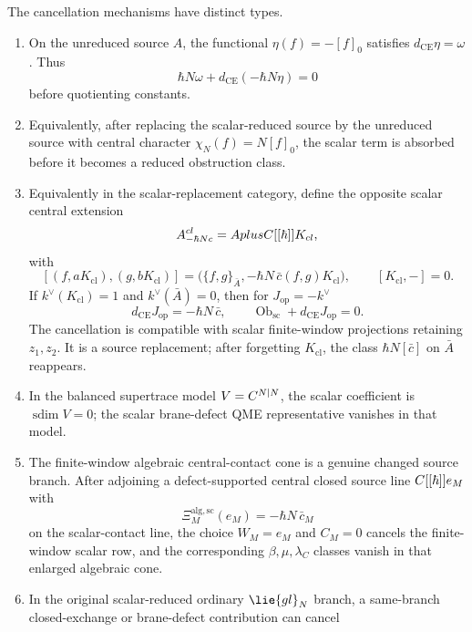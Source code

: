 \documentclass[11pt]{memoir}
\begin{document}
\begin{thm}
  The cancellation mechanisms have distinct types.
  \begin{enumerate}
    \item On the unreduced source \(A\), the functional
      \(\eta(f)=-[f]_0\) satisfies \(d_{\mathrm{CE}}\eta=\omega\).  Thus
      \[
        \hbar N\omega+d_{\mathrm{CE}}(-\hbar N\eta)=0
      \]
      before quotienting constants.
    \item Equivalently, after replacing the scalar-reduced source by the
      unreduced source with central character
      \(\chi_N(f)=N[f]_0\), the scalar term is absorbed before it becomes
      a reduced obstruction class.
    \item Equivalently in the scalar-replacement category, define the
      opposite scalar central extension
      \[
        A^{cl}_{-\hbar Nc}
        =
        AplusC[[\hbar]]K_{cl},
      \]
      with
      \[
        [(f,aK_{\mathrm{cl}}),(g,bK_{\mathrm{cl}})]
        =
        \bigl(\{f,g\}_{\bar A},
        -\hbar N\,\bar c(f,g)K_{\mathrm{cl}}\bigr),
        \qquad [K_{\mathrm{cl}},-]=0 .
      \]
      If \(k^\vee(K_{\mathrm{cl}})=1\) and
      \(k^\vee(\bar A)=0\), then for
      \(J_{\mathrm{op}}=-k^\vee\)
      \[
        d_{\mathrm{CE}}J_{\mathrm{op}}=-\hbar N\,\bar c,
        \qquad
        \operatorname{Ob}_{\mathrm{sc}}+d_{\mathrm{CE}}J_{\mathrm{op}}=0 .
      \]
      The cancellation is compatible with scalar finite-window
      projections retaining \(z_1,z_2\).  It is a source replacement;
      after forgetting \(K_{\mathrm{cl}}\), the class
      \(\hbar N[\bar c]\) on \(\bar A\) reappears.
    \item In the balanced supertrace model \(V=C^{N|N}\), the scalar
      coefficient is \(\operatorname{sdim}V=0\); the scalar
      brane-defect QME representative vanishes in that model.
    \item The finite-window algebraic central-contact cone is a genuine
      changed source branch.  After adjoining a defect-supported central
      closed source line \(C[[\hbar]]e_M\) with
      \[
        \Xi^{\mathrm{alg},\mathrm{sc}}_M(e_M)
        =
        -\hbar N\,\bar c_M
      \]
      on the scalar-contact line, the choice \(W_M=e_M\) and \(C_M=0\)
      cancels the finite-window scalar row, and the corresponding
      \(\beta,\mu,\lambda_C\) classes vanish in that enlarged algebraic
      cone.
    \item In the original scalar-reduced ordinary \(\lie{gl}_N\) branch, a
      same-branch closed-exchange or brane-defect contribution can cancel

\end{enumerate}
\end{thm}
\end{document}

